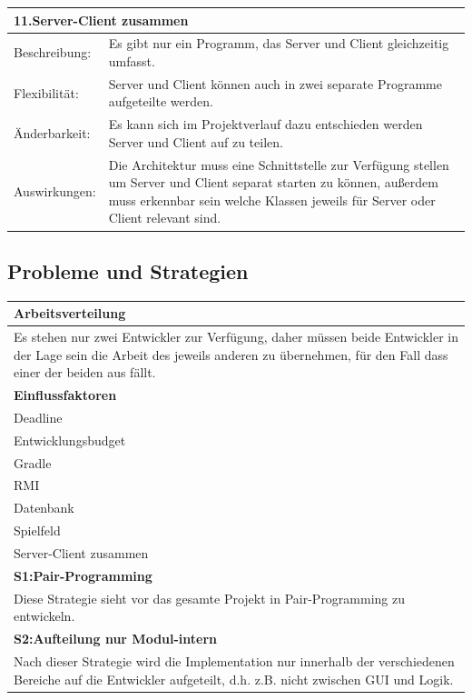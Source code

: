 \documentclass[fontsize=12pt,paper=a4,twoside]{scrartcl}
\begin{document}
\begin{tabular}{|p{3cm}|p{10cm}|}
	\hline
	\multicolumn{2}{|p{10cm}|}{\textbf{11.Server-Client zusammen}}\\
	\hline
	Beschreibung:&Es gibt nur ein Programm, das Server und Client gleichzeitig umfasst.\\
	\hline
	Flexibilität:&Server und Client können auch in zwei separate Programme aufgeteilte werden.\\
	\hline
	Änderbarkeit:&Es kann sich im Projektverlauf dazu entschieden werden Server und Client auf zu teilen.\\
	\hline
	Auswirkungen:&Die Architektur muss eine Schnittstelle zur Verfügung stellen um Server und Client separat starten zu können, außerdem muss erkennbar sein welche Klassen jeweils für Server oder Client relevant sind.\\
	\hline
\end{tabular}


\subsection{Probleme und Strategien}
\label{sec:strategien}

\begin{tabular}{|p{15cm}|}
	\hline
	\bfseries{Arbeitsverteilung}\\ \hline
	Es stehen nur zwei Entwickler zur Verfügung, daher müssen beide Entwickler in der Lage sein die Arbeit des jeweils anderen zu übernehmen, für den Fall dass einer der beiden aus fällt.\\ 
	\textbf{Einflussfaktoren}\\
	Deadline\\ 
	Entwicklungsbudget\\ 
	Gradle\\ 
	RMI\\ 
	Datenbank\\ 
	Spielfeld\\ 
	Server-Client zusammen\\ \hline
	\textbf{S1:Pair-Programming}\\
Diese Strategie sieht vor das gesamte Projekt in Pair-Programming zu entwickeln.\\ \hline
	\textbf{S2:Aufteilung nur Modul-intern}\\
	Nach dieser Strategie wird die Implementation nur innerhalb der verschiedenen Bereiche auf die Entwickler aufgeteilt, d.h. z.B. nicht zwischen GUI und Logik.\\ \hline
\end{tabular} 
\end{document}
